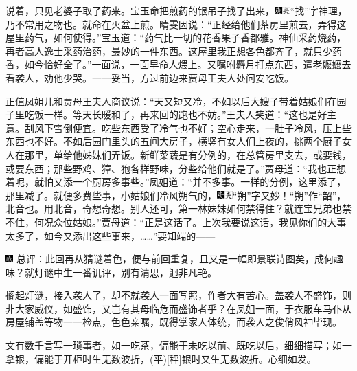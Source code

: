说着，只见老婆子取了药来。宝玉命把煎药的银吊子找了出来，{\includegraphics[width=3mm]{../Images/00004}\includegraphics[width=3mm]{../Images/00012}\footnotesize \kaishu ``找''字神理，乃不常用之物也。}就命在火盆上煎。晴雯因说：``正经给他们茶房里煎去，弄得这屋里药气，如何使得。''宝玉道：``药气比一切的花香果子香都雅。神仙采药烧药，再者高人逸士采药治药，最妙的一件东西。这屋里我正想各色都齐了，就只少药香，如今恰好全了。''一面说，一面早命人煨上。又嘱咐麝月打点东西，遣老嬷嬷去看袭人，劝他少哭。一一妥当，方过前边来贾母王夫人处问安吃饭。

正值凤姐儿和贾母王夫人商议说：``天又短又冷，不如以后大嫂子带着姑娘们在园子里吃饭一样。等天长暖和了，再来回的跑也不妨。''王夫人笑道：``这也是好主意。刮风下雪倒便宜。吃些东西受了冷气也不好；空心走来，一肚子冷风，压上些东西也不好。不如后园门里头的五间大房子，横竖有女人们上夜的，挑两个厨子女人在那里，单给他姊妹们弄饭。新鲜菜蔬是有分例的，在总管房里支去，或要钱，或要东西；那些野鸡、獐、狍各样野味，分些给他们就是了。''贾母道：``我也正想着呢，就怕又添一个厨房多事些。''凤姐道：``并不多事。一样的分例，这里添了，那里减了。就便多费些事，小姑娘们冷风朔气的，{\includegraphics[width=3mm]{../Images/00004}\includegraphics[width=3mm]{../Images/00012}\footnotesize \kaishu ``朔''字又妙！``朔''作``韶''，北音也。用北音，奇想奇想。}别人还可，第一林妹妹如何禁得住？就连宝兄弟也禁不住，何况众位姑娘。''贾母道：``正是这话了。上次我要说这话，我见你们的大事太多了，如今又添出这些事来，\ldots{}\ldots{}''要知端的------

{\includegraphics[width=3mm]{../Images/00005}  \kaishu 总评：此回再从猜谜着色，便与前回重复，且又是一幅即景联诗图矣，成何趣味？就灯谜中生一番讥评，别有清思，迥非凡艳。}

{搁起灯谜，接入袭人了，却不就袭人一面写照，作者大有苦心。盖袭人不盛饰，则非大家威仪，如盛饰，又岂有其母临危而盛饰者乎？在凤姐一面，于衣服车马仆从房屋铺盖等物一一检点，色色亲嘱，既得掌家人体统，而袭人之俊俏风神毕现。}

{文有数千言写一琐事者，如一吃茶，偏能于未吃以前、既吃以后，细细描写；如一拿银，偏能于开柜时生无数波折，{{(平)}}{[}秤{]}银时又生无数波折。心细如发。}
